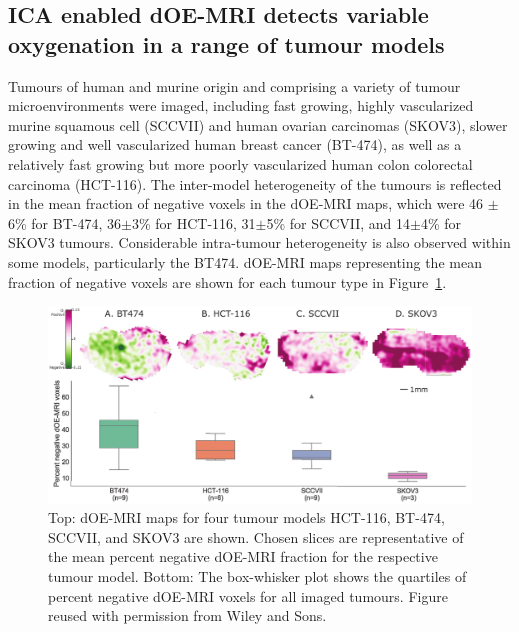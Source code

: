 \subsection{ICA enabled \acs{dOE-MRI} detects variable oxygenation in a range of tumour models}
\label{sec:rangeModels}
Tumours of human and murine origin and comprising a variety of tumour microenvironments were imaged, including fast growing, highly vascularized murine squamous cell (SCCVII) and human ovarian carcinomas (SKOV3), slower growing and well vascularized human breast cancer (BT-474), as well as a relatively fast growing but more poorly vascularized human colon colorectal carcinoma (HCT-116).
The inter-model heterogeneity of the tumours is reflected in the mean fraction of negative voxels in the \acs{dOE-MRI} maps, which were 46 $\pm$ 6\% for BT-474, 36$\pm$3\% for HCT-116, 31$\pm$5\% for SCCVII, and 14$\pm$4\% for SKOV3 tumours. 
Considerable intra-tumour heterogeneity is also observed within some models, particularly the BT474.
\acs{dOE-MRI} maps representing the mean fraction of negative voxels are shown for each tumour type in Figure~\ref{versatile}.
\begin{figure}[htbp]
   \centering
   \includegraphics[width=\textwidth]{oemri_thesis1/oemri_thesis1-images/fig2_versatile.pdf} %
   \caption{Top: \acs{dOE-MRI} maps for four tumour models HCT-116, BT-474, SCCVII, and SKOV3 are shown. Chosen slices are representative of the mean percent negative \acs{dOE-MRI} fraction for the respective tumour model.
Bottom: The box-whisker plot shows the quartiles of percent negative \acs{dOE-MRI} voxels for all imaged tumours. Figure reused with permission from Wiley and Sons.
\label{versatile}}
\end{figure}


